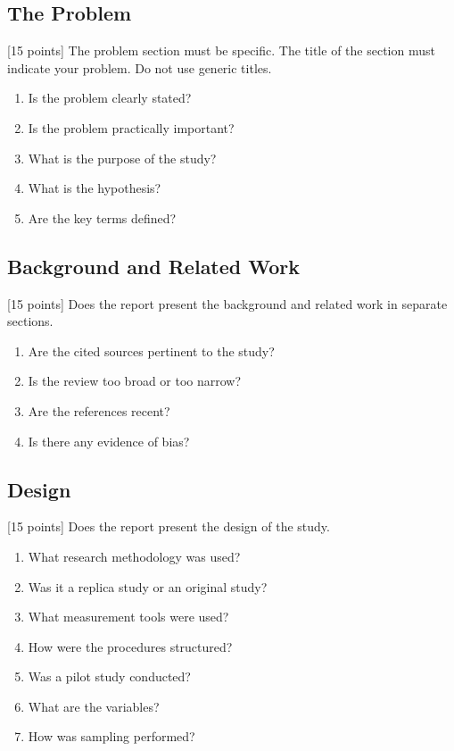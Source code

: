 \documentclass{winslabreport}
\begin{document}
\subsection{The Problem}
[15 points] The problem section must be specific. The title of the section must indicate your problem. Do not use generic titles.

\begin{enumerate}
\item Is the problem clearly stated?
\item Is the problem practically important?
\item What is the purpose of the study?
\item What is the hypothesis?
\item Are the key terms defined?
\end{enumerate}


\subsection{Background and Related Work}
[15 points] Does the report present the background and related work in separate sections.

\begin{enumerate}
\item Are the cited sources pertinent to the study?
\item Is the review too broad or too narrow?
\item Are the references recent?
\item Is there any evidence of bias?
\end{enumerate}

\subsection{Design}
[15 points] Does the report present the design of the study.
\begin{enumerate}
\item What research methodology was used?
\item Was it a replica study or an original study?
\item What measurement tools were used?
\item How were the procedures structured?
\item Was a pilot study conducted?
\item What are the variables?
\item How was sampling performed?
\end{enumerate}
\end{document}
